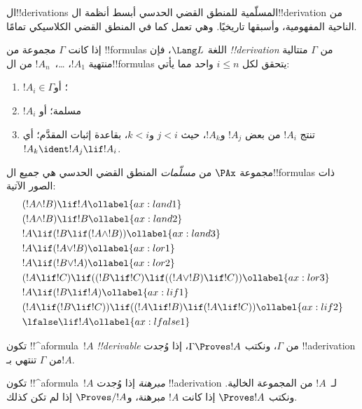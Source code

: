 \documentclass[../../../include/open-logic-section]{subfiles}
\begin{document}


ال!!{derivation}s المسلّمية للمنطق القضي الحدسي أبسط أنظمة
ال!!{derivation} من الناحية المفهومية، وأسبقها تاريخيًا. وهي تعمل كما
في المنطق القضي الكلاسيكي تمامًا.

\begin{defn}[!!^{derivability}]
إذا كانت $\Gamma$ مجموعة من !!{formula}s اللغة $\Lang L$، فإن
\emph{!!{derivation}} من $\Gamma$ متتالية منتهية $!A_1$،
\dots،~$!A_n$ من ال!!{formula}s يتحقق لكل $i \le n$ واحد مما يأتي:
\begin{enumerate}
\item $!A_i \in \Gamma$؛ أو
\item $!A_i$ مسلمة؛ أو
\item تنتج $!A_i$ من بعض $!A_j$ و$!A_k$، حيث $j < i$ و$k < i$،
  بقاعدة إثبات المقدَّم؛ أي $!A_k \ident !A_j \lif !A_i$.
\end{enumerate}
\end{defn}

\begin{defn}
مجموعة $\PAx$ من \emph{مسلّمات} المنطق القضي الحدسي هي جميع
ال!!{formula}s ذات الصور الآتية:
\begin{align}
  & (!A \land !B) \lif !A \ollabel{ax:land1}\\
  & (!A \land !B) \lif !B \ollabel{ax:land2}\\
  & !A \lif (!B \lif (!A \land !B)) \ollabel{ax:land3}\\
  & !A \lif (!A \lor !B) \ollabel{ax:lor1}\\
  & !A \lif (!B \lor !A) \ollabel{ax:lor2}\\
  & (!A \lif !C) \lif ((!B \lif !C) \lif ((!A \lor !B) \lif !C)) \ollabel{ax:lor3}\\
  & !A \lif (!B \lif !A) \ollabel{ax:lif1}\\
  & (!A \lif (!B \lif !C)) \lif ((!A \lif !B) \lif (!A \lif !C)) \ollabel{ax:lif2}\\
  & \lfalse \lif !A \ollabel{ax:lfalse1}
\end{align}
\end{defn}

\begin{defn}[!!^{derivability}]
تكون !!^a{formula}~$!A$ \emph{!!{derivable}} من $\Gamma$، ونكتب
$\Gamma \Proves !A$، إذا وُجدت !!a{derivation} من $\Gamma$ تنتهي
بـ$!A$.
\end{defn}

\begin{defn}[المبرهنات]
تكون !!^a{formula}~$!A$ \emph{مبرهنة} إذا وُجدت !!a{derivation}
لـ~$!A$ من المجموعة الخالية. ونكتب $\Proves !A$ إذا كانت $!A$
مبرهنة، و$\Proves/ !A$ إذا لم تكن كذلك.
\end{defn}
\end{document}
